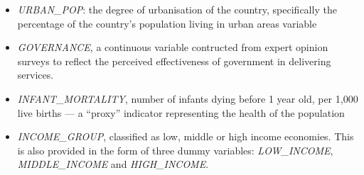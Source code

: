 \documentclass[11pt,a4paper,openany]{book}
\begin{document}
\begin{itemize}
\item
  \emph{URBAN\_POP}: the degree of urbanisation of the country,
  specifically the percentage of the country's population living in
  urban areas variable
\item
  \emph{GOVERNANCE}, a continuous variable contructed from expert
  opinion surveys to reflect the perceived effectiveness of government
  in delivering services.
\item
  \emph{INFANT\_MORTALITY}, number of infants dying before 1 year old,
  per 1,000 live births --- a ``proxy'' indicator representing the
  health of the population
\item
  \emph{INCOME\_GROUP}, classified as low, middle or high income
  economies. This is also provided in the form of three dummy variables:
  \emph{LOW\_INCOME}, \emph{MIDDLE\_INCOME} and \emph{HIGH\_INCOME}.
\end{itemize}
\end{document}
